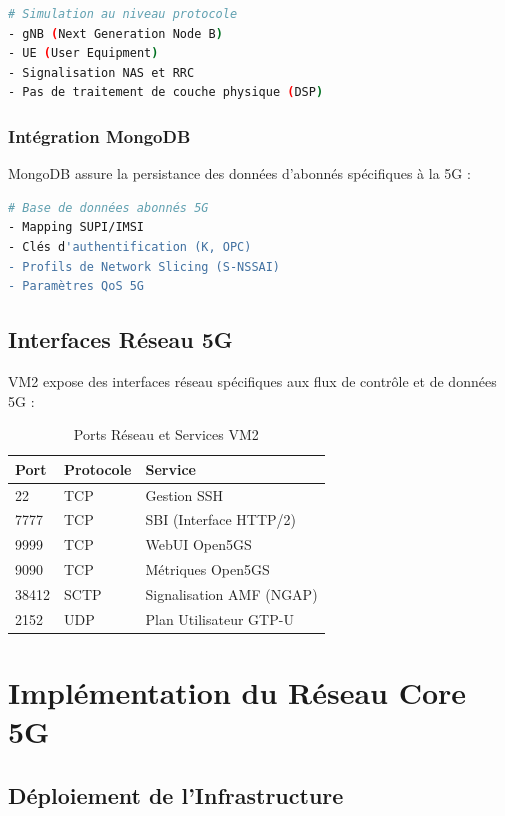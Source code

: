 \documentclass[12pt,a4paper]{report}
\begin{document}
\begin{lstlisting}[caption=Composants UERANSIM, language=bash]
# Simulation au niveau protocole
- gNB (Next Generation Node B)
- UE (User Equipment)
- Signalisation NAS et RRC
- Pas de traitement de couche physique (DSP)
\end{lstlisting}

\subsubsection{Intégration MongoDB}

MongoDB assure la persistance des données d'abonnés spécifiques à la 5G :

\begin{lstlisting}[caption=Configuration MongoDB 5G, language=bash]
# Base de données abonnés 5G
- Mapping SUPI/IMSI
- Clés d'authentification (K, OPC)
- Profils de Network Slicing (S-NSSAI)
- Paramètres QoS 5G
\end{lstlisting}

\subsection{Interfaces Réseau 5G}

VM2 expose des interfaces réseau spécifiques aux flux de contrôle et de données 5G :

\begin{table}[H]
\centering
\caption{Ports Réseau et Services VM2}
\label{tab:vm2-ports}
\begin{tabular}{@{}lll@{}}
\toprule
Port & Protocole & Service \\
\midrule
22 & TCP & Gestion SSH \\
7777 & TCP & SBI (Interface HTTP/2) \\
9999 & TCP & WebUI Open5GS \\
9090 & TCP & Métriques Open5GS \\
38412 & SCTP & Signalisation AMF (NGAP) \\
2152 & UDP & Plan Utilisateur GTP-U \\
\bottomrule
\end{tabular}
\end{table}

\section{Implémentation du Réseau Core 5G}

\subsection{Déploiement de l'Infrastructure}
\end{document}
